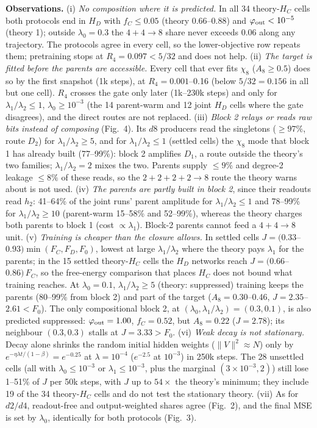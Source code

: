 \documentclass[10pt]{article}
\begin{document}
\textbf{Observations.}
(i) \emph{No composition where it is predicted.}  In all 34 theory-$H_C$ cells both protocols
end in $H_D$ with $f_C\le0.05$ (theory 0.66--0.88) and $\varphi_{\rm out}<10^{-5}$ (theory 1);
outside $\lambda_0=0.3$ the $4{+}4{\to}8$ share never exceeds 0.06 along any trajectory.  The
protocols agree in every cell, so the lower-objective row repeats them; pretraining stops at
$R_4=0.097<5/32$ and does not help.
(ii) \emph{The target is fitted before the parents are accessible.}  Every cell that ever fits
$\chi_8$ ($A_8\ge0.5$) does so by the first snapshot (1k steps), at $R_4=0.001$--0.16 (below
$5/32=0.156$ in all but one cell).  $R_4$ crosses the gate only later (1k--230k steps) and only
for $\lambda_1/\lambda_2\le1$, $\lambda_0\ge10^{-3}$ (the 14 parent-warm and 12 joint $H_D$ cells
where the gate disagrees), and the direct routes are not replaced.
(iii) \emph{Block 2 relays or reads raw bits instead of composing} (Fig.~4).  Its $d8$ producers
read the singletons ($\ge97\%$, route $D_2$) for $\lambda_1/\lambda_2\ge5$, and for
$\lambda_1/\lambda_2\le1$ (settled cells) the $\chi_8$ mode that block 1 has already built
(77--99\%): block 2 amplifies $D_1$, a route outside the theory's two families;
$\lambda_1/\lambda_2=2$ mixes the two.  Parents supply $\le9\%$ and degree-2 leakage $\le8\%$ of
these reads, so the $2{+}2{+}2{+}2{\to}8$ route the theory warns about is not used.
(iv) \emph{The parents are partly built in block 2}, since their readouts read $h_2$: 41--64\% of
the joint runs' parent amplitude for $\lambda_1/\lambda_2\le1$ and 78--99\% for
$\lambda_1/\lambda_2\ge10$ (parent-warm 15--58\% and 52--99\%), whereas the theory charges both
parents to block 1 (cost $\propto\lambda_1$).  Block-2 parents cannot feed a $4{+}4{\to}8$ unit.
(v) \emph{Training is cheaper than the closure allows.}  In settled cells
$J=(0.33$--$0.93)\min(F_C,F_D,F_0)$, lowest at large $\lambda_1/\lambda_2$ where the theory pays
$\lambda_1$ for the parents; in the 15 settled theory-$H_C$ cells the $H_D$ networks reach
$J=(0.66$--$0.86)\,F_C$, so the free-energy comparison that places $H_C$ does not bound what
training reaches.  At $\lambda_0=0.1$, $\lambda_1/\lambda_2\ge5$ (theory: suppressed) training
keeps the parents (80--99\% from block 2) and part of the target ($A_8=0.30$--0.46,
$J=2.35$--$2.61<F_0$).  The only compositional block 2, at $(\lambda_0,\lambda_1/\lambda_2)=(0.3,
0.1)$, is also predicted suppressed: $\varphi_{\rm out}=1.00$, $f_C=0.52$, but $A_8=0.22$
($J=2.78$); its neighbour $(0.3,0.3)$ stalls at $J=3.33>F_0$.
(vi) \emph{Weak decay is not stationary.}  Decay alone shrinks the random initial hidden
weights ($\|V\|^2\approx N$) only by $e^{-\eta\lambda t/(1-\beta)}=e^{-0.25}$ at
$\lambda=10^{-4}$ ($e^{-2.5}$ at $10^{-3}$) in 250k steps.  The 28 unsettled cells (all with
$\lambda_0\le10^{-3}$ or $\lambda_1\le10^{-3}$, plus the marginal $(3\times10^{-3},2)$) still lose
1--51\% of $J$ per 50k steps, with $J$ up to $54\times$ the theory's minimum; they include 19 of
the 34 theory-$H_C$ cells and do not test the stationary theory.
(vii) As for $d2/d4$, readout-free and output-weighted shares agree (Fig.~2), and the final
MSE is set by $\lambda_0$, identically for both protocols (Fig.~3).
\end{document}
